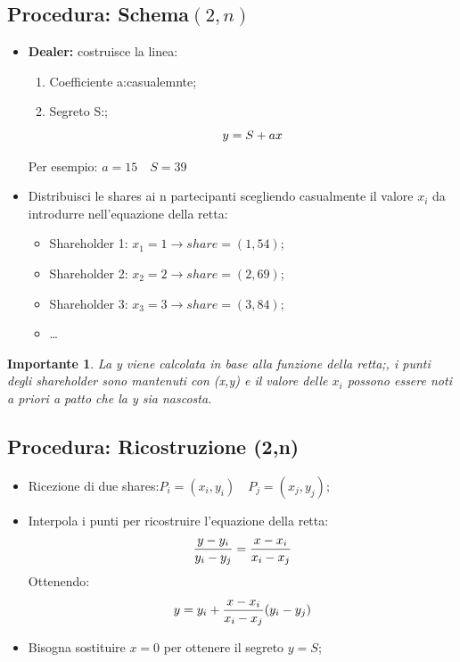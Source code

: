 \documentclass{book}
\newtheorem*{Importante}{\textbf{Importante}}
\begin{document}
\subsection{Procedura: Schema\((2,n)\)}
\begin{itemize}
    \item \textbf{Dealer:} costruisce la linea:
          \begin{enumerate}
              \item Coefficiente a:\@scelto casualemnte;
              \item Segreto S:\@noto;
                    \begin{equation*}
                        \centering
                        y=S+ax
                    \end{equation*}
          \end{enumerate}
          Per esempio: \(a=15\quad S=39\)
    \item Distribuisci le shares ai n partecipanti scegliendo casualmente il valore \(x_{i}\) da introdurre nell'equazione della retta:
          \begin{itemize}
              \item Shareholder 1: \(x_{1}=1\rightarrow share=(1,54)\);
              \item Shareholder 2: \(x_{2}=2\rightarrow share=(2,69)\);
              \item Shareholder 3: \(x_{3}=3\rightarrow share=(3,84)\);
              \item \dots
          \end{itemize}
\end{itemize}
\begin{Importante}
    La y viene calcolata in base alla funzione della retta;\@tuttavia, i punti degli shareholder sono mantenuti con (x,y) e il valore delle \(x_{i}\) possono essere noti a priori a patto che la y sia nascosta\@.
\end{Importante}
\subsection{Procedura: Ricostruzione (2,n)}
\begin{itemize}
    \item Ricezione di due shares:\(P_{i}=(x_{i},y_{i})\quad P_{j}=(x_{j},y_{j})\);
    \item Interpola i punti per ricostruire l'equazione della retta:
          \begin{equation*}
              \centering
              \frac{y-y_{i}}{y_{i}-y_{j}}=\frac{x-x_{i}}{x_{i}-x_{j}}
          \end{equation*}
          Ottenendo:
          \begin{equation*}
              \centering
              y=y_{i}+\frac{x-x_{i}}{x_{i}-x_{j}}(y_{i}-y_{j})
          \end{equation*}
    \item Bisogna sostituire \(x=0\) per ottenere il segreto \(y=S\);
\end{itemize}
\end{document}
